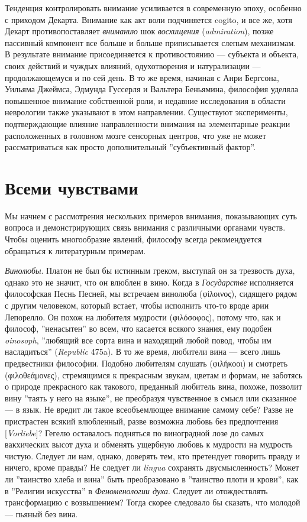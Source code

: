 \documentclass[12pt]{book}
\begin{document}
Тенденция контролировать внимание усиливается в современную эпоху, особенно с приходом Декарта. Внимание как акт воли подчиняется cogito, и все же, хотя Декарт противопоставляет \textit{вниманию} шок \textit{восхищения} (\textit{admiration}), позже пассивный компонент все больше и больше приписывается слепым механизмам. В результате внимание присоединяется к противостоянию --- субъекта и объекта, своих действий и чуждых влияний, одухотворения и натурализации --- продолжающемуся и по сей день. В то же время, начиная с Анри Бергсона, Уильяма Джеймса, Эдмунда Гуссерля и Вальтера Беньямина, философия уделяла повышенное внимание собственной роли, и недавние исследования в области неврологии также указывают в этом направлении. Существуют эксперименты, подтверждающие влияние направленности внимания на элементарные реакции расположенных в головном мозге сенсорных центров, что уже не может рассматриваться как просто дополнительный ''субъективный фактор''.

\section{Всеми чувствами}

Мы начнем с рассмотрения нескольких примеров внимания, показывающих суть вопроса и демонстрирующих связь внимания с различными органами чувств. Чтобы оценить многообразие явлений, философу всегда рекомендуется обращаться к литературным примерам.

\textit{Винолюбы}. Платон не был бы истинным греком, выступай он за трезвость духа, однако это не значит, что он влюблен в вино. Когда в \textit{Государстве} исполняется философская Песнь Песней, мы встречаем винолюба (φίλοινος), сидящего рядом с другим человеком, который встает, чтобы исполнить что-то вроде арии Лепорелло. Он похож на любителя мудрости (φιλόσοφος), потому что, как и философ, ''ненасытен'' во всем, что касается всякого знания, ему подобен \textit{oinosoph}, ''любящий все сорта вина и находящий любой повод, чтобы им насладиться'' (\textit{Republic} 475a). В то же время, любители вина --- всего лишь предвестники философии. Подобно любителям слушать (φιλήκοοι) и смотреть (φιλοθεάμονες), стремящимся к прекрасным звукам, цветам и формам, не заботясь о природе прекрасного как такового, преданный любитель вина, похоже, позволит вину ''таять у него на языке'', не преобразуя чувственное в смысл или сказанное --- в язык. Не вредит ли такое всеобъемлющее внимание самому себе? Разве не пристрастен всякий влюбленный, разве возможна любовь без предпочтения [\textit{Vorliebe}]? Гегелю оставалось подняться по виноградной лозе до самых вакхических высот духа и обменять ущербную любовь к мудрости на мудрость чистую. Следует ли нам, однако, доверять тем, кто претендует говорить правду и ничего, кроме правды? Не следует ли \textit{lingua} сохранять двусмысленность? Может ли ''таинство хлеба и вина'' быть преобразовано в ''таинство плоти и крови'', как в ''Религии искусства'' в \textit{Феноменологии духа}. Следует ли отождествлять трансформацию с возвышением? Тогда скорее следовало бы сказать, что молодой --- пьяный без вина.
\end{document}
